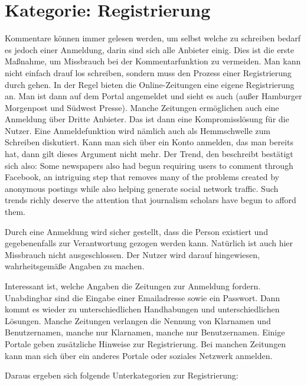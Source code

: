 

\section{Kategorie: \glqq Registrierung\grqq}

Kommentare können immer gelesen werden, um selbst welche zu schreiben bedarf es
jedoch einer Anmeldung, darin sind sich alle Anbieter einig. Dies ist die erste
Maßnahme, um Missbrauch bei der Kommentarfunktion zu vermeiden. Man kann nicht
einfach drauf los schreiben, sondern muss den Prozess einer Registrierung durch
gehen. In der Regel bieten die Online-Zeitungen eine eigene Registrierung an.
Man ist dann auf dem Portal angemeldet und sieht es auch (außer Hamburger
Morgenpost und Südwest Presse). Manche Zeitungen ermöglichen auch eine Anmeldung
über Dritte Anbieter. Das ist dann eine Kompromisslösung für die Nutzer. Eine
Anmeldefunktion wird nämlich auch als Hemmschwelle zum Schreiben diskutiert.
Kann man sich über ein Konto anmelden, das man bereits hat, dann gilt dieses
Argument nicht mehr. Der Trend, den \textcite[S.~69]{singer:2014}
beschreibt bestätigt sich also: \glqq Some newspapers also had begun requiring users to
comment through Facebook, an intriguing step that removes many of the problems
created by anonymous postings while also helping generate social network
traffic. Such trends richly deserve the attention that journalism scholars have
begun to afford them.\grqq

Durch eine Anmeldung wird sicher gestellt, dass die Person existiert und 
gegebenenfalls zur Verantwortung gezogen werden kann.
Natürlich ist auch hier Missbrauch nicht ausgeschlossen. Der Nutzer wird darauf hingewiesen,
wahrheitsgemäße Angaben zu machen. 

Interessant ist, welche Angaben die Zeitungen zur Anmeldung fordern. Unabdingbar
sind die Eingabe einer Emailadresse sowie ein Passwort. Dann kommt es wieder zu
unterschiedlichen Handhabungen und unterschiedlichen Lösungen. Manche Zeitungen
verlangen die Nennung von Klarnamen und Benutzernamen, manche nur Klarnamen,
manche nur Benutzernamen. Einige Portale geben zusätzliche Hinweise zur
Registrierung. Bei manchen Zeitungen kann man sich über ein anderes Portale oder 
soziales Netzwerk anmelden.

Daraus ergeben sich folgende Unterkategorien zur Registrierung:

